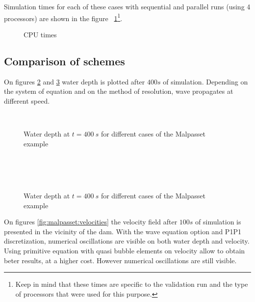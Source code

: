 Simulation times for each of these cases with sequential and parallel runs (using 4 processors) are shown in the figure ~\ref{fig:malpasset:cputime}\footnote{Keep in mind that these times
are specific to the validation run and the type of processors that were used for this purpose.}.

\begin{figure}[h!]
  \centering
  \caption{CPU times}\label{fig:malpasset:cputime}
\end{figure}

\subsection{Comparison of schemes}

On figures \ref{fig:malpasset:WD_all1} and \ref{fig:malpasset:WD_all2} water depth is plotted after $400s$ of simulation.
Depending on the system of equation and on the method of resolution, wave propagates at different speed.

\begin{figure}[H]
  \centering
  \\
  \caption{Water depth at $t=400~s$ for different cases of the Malpasset example}\label{fig:malpasset:WD_all1}
\end{figure}

\begin{figure}[H]
  \centering
  \\
  \\
  \\
  \caption{Water depth at $t=400~s$ for different cases of the Malpasset example}\label{fig:malpasset:WD_all2}
\end{figure}

On figures \ref{fig:malpasset:velocities} the velocity field after $100s$ of simulation is presented 
in the vicinity of the dam. With the wave equation option and P1P1 discretization, 
numerical oscillations are visible on both water depth and velocity.
Using primitive equation with quasi bubble elements on velocity allow to obtain beter results, at a higher cost.
However numerical oscillations are still visible.

